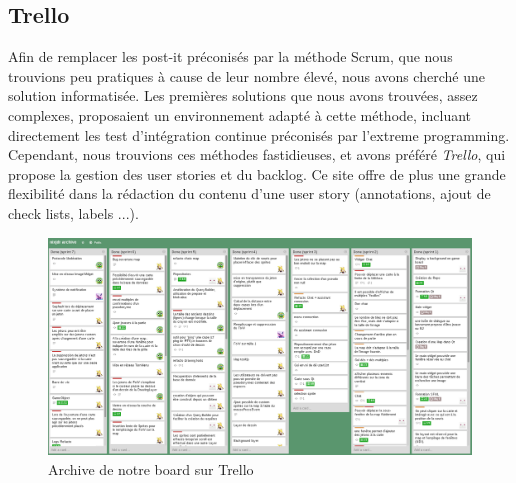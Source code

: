 \subsection{Trello}

Afin de remplacer les post-it préconisés par la méthode Scrum, que nous trouvions peu pratiques à cause de leur nombre élevé, nous avons cherché une solution informatisée.
Les premières solutions que nous avons trouvées, assez complexes, proposaient un environnement adapté à cette méthode, incluant directement les test d'intégration continue préconisés par l'extreme programming. Cependant, nous trouvions ces méthodes fastidieuses, et avons préféré \textit{Trello}, qui propose la gestion des user stories et du backlog.
Ce site offre de plus une grande flexibilité dans la rédaction du contenu d'une user story (annotations, ajout de check lists, labels ...).

\begin{figure}[h!]
	\centering
	\includegraphics[width=1\textwidth]{img/trello_archive.png}
	\caption{Archive de notre board sur Trello}
\end{figure}

